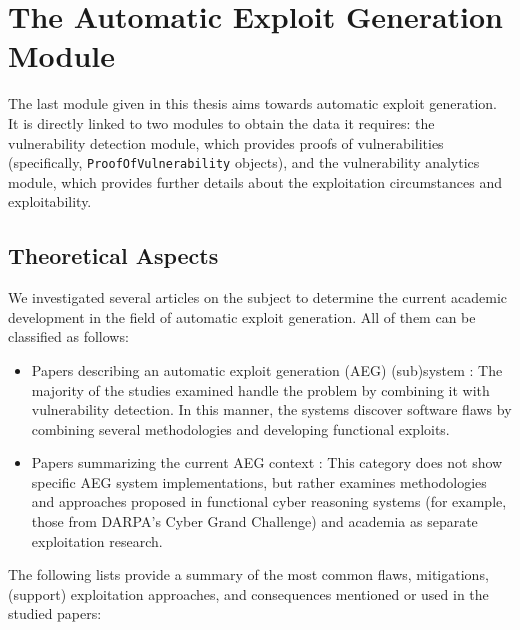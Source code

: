 \documentclass[../main.tex]{subfiles}
\begin{document}
\hypertarget{automatic-exploit-generation-module}{%
      \chapter{The Automatic Exploit Generation
        Module}\label{automatic-exploit-generation-module}}

The last module \cite{aeg_module_repo} given in this thesis aims towards
automatic exploit generation. It is directly linked to two modules to obtain
the data it requires: the vulnerability detection module, which provides proofs
of vulnerabilities (specifically, \texttt{ProofOfVulnerability} objects), and
the vulnerability analytics module, which provides further details about the
exploitation circumstances and exploitability.

\hypertarget{theoretical-aspects}{%
      \section{Theoretical Aspects}\label{theoretical-aspects}}

We investigated several articles on the subject to determine the current
academic development in the field of automatic exploit generation. All of them
can be classified as follows:

\begin{itemize}
      \tightlist
      \item
            Papers describing an automatic exploit generation (AEG) (sub)system \cite{aeg} \cite{mayhem_paper} \cite{bop} \cite{bof_aeg}:
            The majority of the studies examined handle the problem by combining
            it with vulnerability detection. In this manner, the systems discover
            software flaws by combining several methodologies and developing
            functional exploits.
      \item
            Papers summarizing the current AEG context \cite{crs_aeg_survey} \cite{alphahacking} \cite{code_reuse_survey}:
            This category does not show specific AEG system implementations, but
            rather examines methodologies and approaches proposed in functional
            cyber reasoning systems (for example, those from DARPA's Cyber Grand
            Challenge) and academia as separate exploitation research.
\end{itemize}

The following lists provide a summary of the most common flaws, mitigations,
(support) exploitation approaches, and consequences mentioned or used in the
studied papers:
\end{document}
